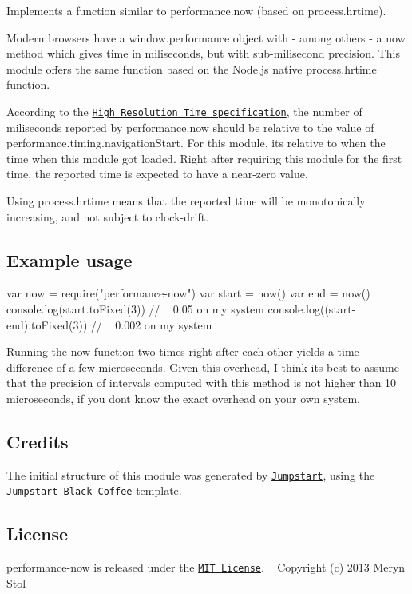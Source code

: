 Implements a function similar to {\ttfamily performance.\+now} (based on {\ttfamily process.\+hrtime}).

Modern browsers have a {\ttfamily window.\+performance} object with -\/ among others -\/ a {\ttfamily now} method which gives time in miliseconds, but with sub-\/milisecond precision. This module offers the same function based on the Node.\+js native {\ttfamily process.\+hrtime} function.

According to the \href{http://www.w3.org/TR/hr-time/}{\tt High Resolution Time specification}, the number of miliseconds reported by {\ttfamily performance.\+now} should be relative to the value of {\ttfamily performance.\+timing.\+navigation\+Start}. For this module, it\textquotesingle{}s relative to when the time when this module got loaded. Right after requiring this module for the first time, the reported time is expected to have a near-\/zero value.

Using {\ttfamily process.\+hrtime} means that the reported time will be monotonically increasing, and not subject to clock-\/drift.

\subsection*{Example usage}


\begin{DoxyCode}
var now = require("performance-now")
var start = now()
var end = now()
console.log(start.toFixed(3)) // ~ 0.05 on my system
console.log((start-end).toFixed(3)) // ~ 0.002 on my system
\end{DoxyCode}


Running the now function two times right after each other yields a time difference of a few microseconds. Given this overhead, I think it\textquotesingle{}s best to assume that the precision of intervals computed with this method is not higher than 10 microseconds, if you don\textquotesingle{}t know the exact overhead on your own system.

\subsection*{Credits}

The initial structure of this module was generated by \href{https://github.com/meryn/jumpstart}{\tt Jumpstart}, using the \href{https://github.com/meryn/jumpstart-black-coffee}{\tt Jumpstart Black Coffee} template.

\subsection*{License}

performance-\/now is released under the \href{http://opensource.org/licenses/MIT}{\tt M\+IT License}. ~\newline
Copyright (c) 2013 Meryn Stol 